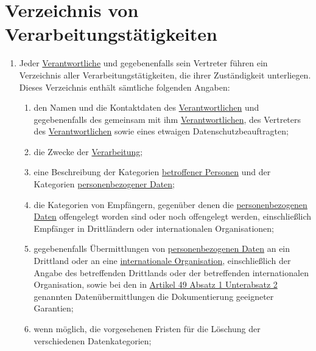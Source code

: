 \chapter{Verzeichnis von Verarbeitungstätigkeiten}
\label{ch:30}


\begin{enumerate}

  \item Jeder \hyperref[itm:04-7]{Verantwortliche} und gegebenenfalls sein Vertreter führen ein Verzeichnis aller Verarbeitungstätigkeiten,
   die ihrer Zuständigkeit unterliegen. Dieses Verzeichnis enthält sämtliche folgenden Angaben:
  \label{itm:30-1}

  \begin{enumerate}
  
    \item den Namen und die Kontaktdaten des \hyperref[itm:04-7]{Verantwortlichen} und gegebenenfalls des gemeinsam mit ihm \hyperref[itm:04-7]{Verantwortlichen},
     des Vertreters des \hyperref[itm:04-7]{Verantwortlichen} sowie eines etwaigen Datenschutzbeauftragten;
    \label{itm:30-1a}

    \item die Zwecke der \hyperref[itm:04-2]{Verarbeitung};
    \label{itm:30-1b}

    \item eine Beschreibung der Kategorien \hyperref[itm:04-1]{betroffener Personen} und der Kategorien \hyperref[itm:04-1]{personenbezogener Daten};
    \label{itm:30-1c}

    \item die Kategorien von Empfängern, gegenüber denen die \hyperref[itm:04-1]{personenbezogenen Daten} offengelegt worden sind oder noch
     offengelegt werden, einschließlich Empfänger in Drittländern oder internationalen Organisationen;
    \label{itm:30-1d}

    \item gegebenenfalls Übermittlungen von \hyperref[itm:04-1]{personenbezogenen Daten} an ein Drittland oder an eine \hyperref[itm:04-29]{internationale
     Organisation}, einschließlich der Angabe des betreffenden Drittlands oder der betreffenden internationalen
     Organisation, sowie bei den in \hyperref[itm:49-1-2]{Artikel 49 Absatz 1 Unterabsatz 2} genannten
     Datenübermittlungen die Dokumentierung geeigneter Garantien;
    \label{itm:30-1e}

    \item wenn möglich, die vorgesehenen Fristen für die Löschung der verschiedenen Datenkategorien;
    \label{itm:30-1f}


\end{enumerate}
\end{enumerate}
